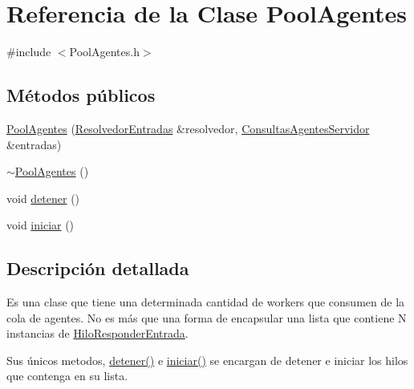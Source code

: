 \hypertarget{classPoolAgentes}{\section{\-Referencia de la \-Clase \-Pool\-Agentes}
\label{classPoolAgentes}
}


{\ttfamily \#include $<$\-Pool\-Agentes.\-h$>$}

\subsection*{\-Métodos públicos}
\begin{DoxyCompactItemize}
\item 
\hyperlink{classPoolAgentes_a9607b621706f1f5100c7d72b453ea1d2}{\-Pool\-Agentes} (\hyperlink{classResolvedorEntradas}{\-Resolvedor\-Entradas} \&resolvedor, \hyperlink{classBLQueue}{\-Consultas\-Agentes\-Servidor} \&entradas)
\item 
\hyperlink{classPoolAgentes_ae5eee99676a5ab94236f85831149caef}{$\sim$\-Pool\-Agentes} ()
\item 
void \hyperlink{classPoolAgentes_a1a4362cbb173ca0475525551d87d5348}{detener} ()
\item 
void \hyperlink{classPoolAgentes_a7a47447438844ebfa5113a3e0c4b62db}{iniciar} ()
\end{DoxyCompactItemize}


\subsection{\-Descripción detallada}
\-Es una clase que tiene una determinada cantidad de workers que consumen de la cola de agentes. \-No es más que una forma de encapsular una lista que contiene \-N instancias de \hyperlink{classHiloResponderEntrada}{\-Hilo\-Responder\-Entrada}.

\-Sus únicos metodos, \hyperlink{classPoolAgentes_a1a4362cbb173ca0475525551d87d5348}{detener()} e \hyperlink{classPoolAgentes_a7a47447438844ebfa5113a3e0c4b62db}{iniciar()} se encargan de detener e iniciar los hilos que contenga en su lista. 

